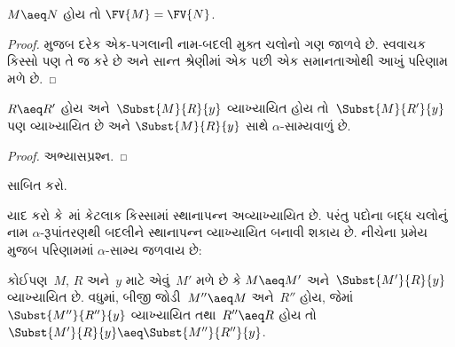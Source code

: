 \begin{thm}
  $M \aeq N$ હોય તો $\FV{M} = \FV{N}$.
\end{thm}

\begin{proof}
   મુજબ દરેક એક-પગલાની નામ-બદલી મુક્ત ચલોનો
  ગણ જાળવે છે. સ્વવાચક કિસ્સો પણ તે જ કરે છે અને સાન્ત
  શ્રેણીમાં એક પછી એક સમાનતાઓથી આખું પરિણામ મળે છે.
\end{proof}

\begin{lem}
  $R \aeq R'$ હોય અને~$\Subst{M}{R}{y}$ વ્યાખ્યાયિત હોય
  તો~$\Subst{M}{R'}{y}$ પણ વ્યાખ્યાયિત છે અને
  $\Subst{M}{R}{y}$ સાથે $\alpha$-સામ્યવાળું છે.
\end{lem}

\begin{proof}
  અભ્યાસપ્રશ્ન.
\end{proof}

\begin{prob}
   સાબિત કરો.
\end{prob}

યાદ કરો કે~માં કેટલાક કિસ્સામાં સ્થાનાપન્ન
અવ્યાખ્યાયિત છે. પરંતુ પદોના બદ્ધ ચલોનું નામ
$\alpha$-રૂપાંતરણથી બદલીને સ્થાનાપન્ન વ્યાખ્યાયિત બનાવી
શકાય છે. નીચેના પ્રમેય મુજબ પરિણામમાં $\alpha$-સામ્ય
જળવાય છે:

\begin{thm}
  કોઈપણ~$M$, $R$ અને~$y$ માટે એવું~$M'$ મળે છે કે
  $M \aeq M'$ અને~$\Subst{M'}{R}{y}$ વ્યાખ્યાયિત છે.
  વધુમાં, બીજી જોડી~$M'' \aeq M$ અને~$R''$ હોય, જેમાં
  $\Subst{M''}{R''}{y}$ વ્યાખ્યાયિત તથા~$R'' \aeq R$
  હોય તો
  $\Subst{M'}{R}{y} \aeq \Subst{M''}{R''}{y}$.
\end{thm}

